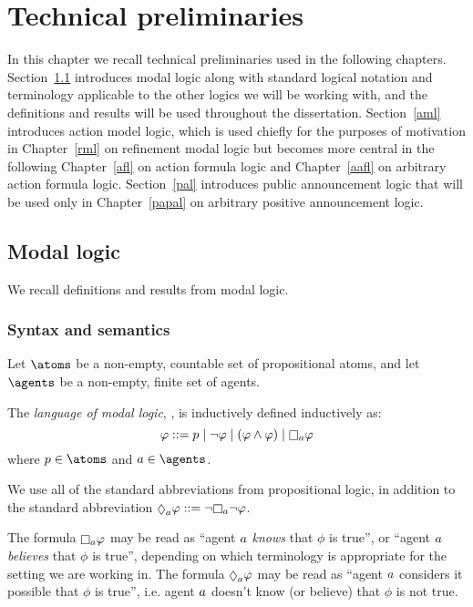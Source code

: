 \chapter{Technical preliminaries}\label{technical}

In this chapter we recall technical preliminaries used in the following chapters.
Section~\ref{ml} introduces modal logic along with standard logical notation and terminology applicable to the other logics we will be working with, and the definitions and results will be used throughout the dissertation.
Section~\ref{aml} introduces action model logic, which is used chiefly for the purposes of motivation in Chapter~\ref{rml} on refinement modal logic but becomes more central in the following Chapter~\ref{afl} on action formula logic and Chapter~\ref{aafl} on arbitrary action formula logic.
Section~\ref{pal} introduces public announcement logic that will be used only in Chapter~\ref{papal} on arbitrary positive announcement logic. 

\section{Modal logic}\label{ml}

We recall definitions and results from modal logic.

\subsection{Syntax and semantics}

Let $\atoms$ be a non-empty, countable set of propositional atoms, and
let $\agents$ be a non-empty, finite set of agents.

\begin{definition}
The {\em language of modal logic}, \langMl{}, is inductively defined inductively as:
$$
\phi ::= 
    \atomP \mid
    \lnot \phi \mid
    (\phi \land \phi) \mid
    \necessary[\agentA] \phi
$$
where $\atomP \in \atoms$ and $\agentA \in \agents$.
\end{definition}

We use all of the standard abbreviations from propositional logic, in addition to the standard abbreviation $\possible[\agentA] \phi ::= \lnot \necessary[\agentA] \lnot \phi$.

The formula $\necessary[\agentA] \phi$ may be read as ``agent $a$ {\em knows} that $\phi$ is true'', or ``agent $a$ {\em believes} that $\phi$ is true'', depending on which terminology is appropriate for the setting we are working in.
The formula $\possible[\agentA] \phi$ may be read as ``agent $a$ considers it possible that $\phi$ is true'', i.e. agent $a$ doesn't know (or believe) that $\phi$ is not true.

